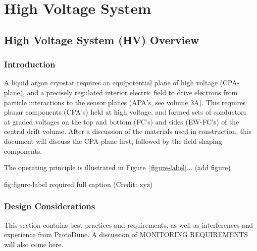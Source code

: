 \chapter{High Voltage System}
\label{ch:fdsp-hv}

\section{High Voltage System (HV) Overview}
\label{sec:fdsp-hv-ov}


\subsection{Introduction}
\label{sec:fdsp-hv-intro}
A liquid argon cryostat requires an equipotential plane of high voltage (CPA-plane), and a precisely regulated interior electric field to drive electrons from particle interactions to the sensor planes (APA's, see volume 3A). This requires planar components (CPA's)  held at high voltage, and formed sets of conductors at graded voltages on the top and bottom (FC's) and sides (EW-FC's) of the central drift volume. After a discussion of the materials used in construction, this document will discuss the CPA-plane first, followed by the field shaping components. 



The operating principle is illustrated in Figure~\ref{figure-label}... (add figure)

\begin{dunefigure}{fig:figure-label}
{required full caption (Credit: xyz)}
\end{dunefigure}

\subsection{Design Considerations}
\label{sec:fdsp-hv-des-consid}
This section contains best practices and requirements, as well as interferences and experience from ProtoDune. A discussion of MONITORING REQUIREMENTS will also come here.

 
